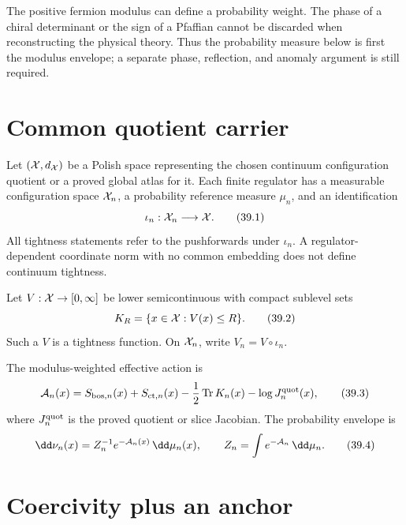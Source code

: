 \documentclass[11pt]{article}
\theoremstyle{remark}
\begin{document}
The positive fermion modulus can define a probability weight.  The
phase of a chiral determinant or the sign of a Pfaffian cannot be
discarded when reconstructing the physical theory.  Thus the
probability measure below is first the modulus envelope; a separate
phase, reflection, and anomaly argument is still required.

\section{Common quotient carrier}

Let \(({\cal X},d_{\cal X})\) be a Polish space representing the
chosen continuum configuration quotient or a proved global atlas
for it.  Each finite regulator has a measurable configuration space
\({\cal X}_n\), a probability reference measure \(\mu_n\), and an
identification
\[
 \iota_n:{\cal X}_n\longrightarrow{\cal X}.              \tag{39.1}
\]
All tightness statements refer to the pushforwards under
\(\iota_n\).  A regulator-dependent coordinate norm with no common
embedding does not define continuum tightness.

Let \(V:{\cal X}\to[0,\infty]\) be lower semicontinuous with compact
sublevel sets
\[
 K_R=\{x\in{\cal X}:V(x)\leq R\}.                        \tag{39.2}
\]
Such a \(V\) is a tightness function.  On \({\cal X}_n\), write
\(V_n=V\circ\iota_n\).

The modulus-weighted effective action is
\[
 {\cal A}_n(x)=
 S_{{\rm bos},n}(x)+S_{{\rm ct},n}(x)
 -\frac12\operatorname{Tr}K_n(x)
 -\log J_n^{\rm quot}(x),                               \tag{39.3}
\]
where \(J_n^{\rm quot}\) is the proved quotient or slice Jacobian.
The probability envelope is
\[
 \dd\nu_n(x)=Z_n^{-1}e^{-{\cal A}_n(x)}\,\dd\mu_n(x),
 \qquad
 Z_n=\int e^{-{\cal A}_n}\,\dd\mu_n.                    \tag{39.4}
\]

\section{Coercivity plus an anchor}
\end{document}
